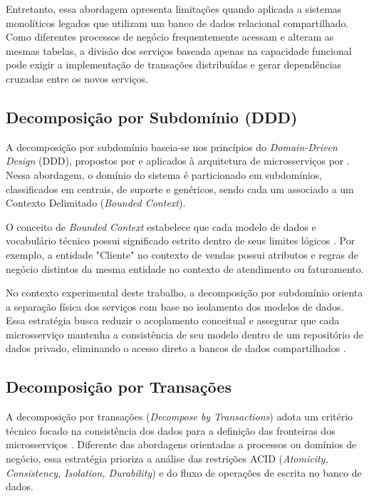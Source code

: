 Entretanto, essa abordagem apresenta limitações quando aplicada a sistemas monolíticos legados que utilizam um banco de dados relacional compartilhado. Como diferentes processos de negócio frequentemente acessam e alteram as mesmas tabelas, a divisão dos serviços baseada apenas na capacidade funcional pode exigir a implementação de transações distribuídas e gerar dependências cruzadas entre os novos serviços.



\subsection{Decomposição por Subdomínio (DDD)}

A decomposição por subdomínio baseia-se nos princípios do \textit{Domain-Driven Design} (DDD), propostos por \textcite{evans2003} e aplicados à arquitetura de microsserviços por \textcite{richardson2018}. Nessa abordagem, o domínio do sistema é particionado em subdomínios, classificados em centrais, de suporte e genéricos, sendo cada um associado a um Contexto Delimitado (\textit{Bounded Context}).

O conceito de \textit{Bounded Context} estabelece que cada modelo de dados e vocabulário técnico possui significado estrito dentro de seus limites lógicos \cite{evans2003}. Por exemplo, a entidade "Cliente" no contexto de vendas possui atributos e regras de negócio distintos da mesma entidade no contexto de atendimento ou faturamento.

No contexto experimental deste trabalho, a decomposição por subdomínio orienta a separação física dos serviços com base no isolamento dos modelos de dados. Essa estratégia busca reduzir o acoplamento conceitual e assegurar que cada microsserviço mantenha a consistência de seu modelo dentro de um repositório de dados privado, eliminando o acesso direto a bancos de dados compartilhados \cite{newman2020}.


\subsection{Decomposição por Transações}

A decomposição por transações (\textit{Decompose by Transactions}) adota um critério técnico focado na consistência dos dados para a definição das fronteiras dos microsserviços \cite{richardson2018}. Diferente das abordagens orientadas a processos ou domínios de negócio, essa estratégia prioriza a análise das restrições ACID (\textit{Atomicity, Consistency, Isolation, Durability}) e do fluxo de operações de escrita no banco de dados.

